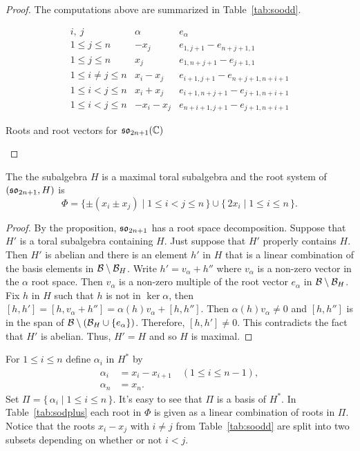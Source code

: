 \begin{proof}
  The computations above are summarized in Table~\ref{tab:soodd}.
  \begin{table}[h!tb]
    \small {}
    \renewcommand{\arraystretch}{1.3}
    \begin{equation*}
      \begin{array}{l|cc}
        i,\ j &\alpha &e_\alpha\\\hline
        1\leq j\leq n&-x_j & e_{1,j+1} -e_{n+j+1, 1}\\
        1\leq j\leq n&x_j & e_{1,n+j+1} -e_{j+1, 1}\\
        1\leq i\ne j\leq n&x_i-x_j &  e_{i+1,j+1} -e_{n+j+1, n+i+1} \\
        1\leq i< j\leq n&x_i+x_j & e_{i+1,n+j+1} -e_{j+1, n+i+1} \\ 
        1\leq i< j\leq n&-x_i-x_j & e_{n+i+1,j+1} -e_{j+1, n+i+1}
      \end{array}  
    \end{equation*}
    \caption{Roots and root vectors for $\mathfrak {so}_{2n+1}({\mathbb C})$}\label{tab:soodd}
  \end{table}
\end{proof}

\begin{corollary}
  The the subalgebra $H$ is a maximal toral subalgebra and the root system
  of $(\mathfrak {so}_{2n+1}, H)$ is
  \[
  \Phi=\{\pm(x_i\pm x_j) \mid 1\leq i<j\leq n\,\} \cup \{\, 2x_i\mid 1\leq
  i\leq n\,\}.
  \]
\end{corollary}

\begin{proof}
  By the proposition, $\mathfrak {so}_{2n+1}$ has a root space decomposition. Suppose
  that $H'$ is a toral subalgebra containing $H$. Just suppose that $H'$
  properly contains $H$. Then $H'$ is abelian and there is an element $h'$
  in $H$ that is a linear combination of the basis elements in ${\mathcal B}\setminus
  {\mathcal B}_H$. Write $h'=v_\alpha+h''$ where $v_\alpha$ is a non-zero vector in
  the $\alpha$ root space. Then $v_\alpha$ is a non-zero multiple of the
  root vector $e_\alpha$ in ${\mathcal B}\setminus {\mathcal B}_H$. Fix $h$ in $H$ such that
  $h$ is not in $\ker \alpha$, then $[h,h']= [h, v_\alpha+h'']=
  \alpha(h)v_\alpha + [h,h'']$. Then $\alpha(h)v_\alpha\ne 0$ and $[h, h'']$
  is in the span of ${\mathcal B}\setminus({\mathcal B}_H\cup \{e_\alpha\})$. Therefore,
  $[h,h'] \ne0$. This contradicts the fact that $H'$ is abelian. Thus,
  $H'=H$ and so $H$ is maximal.
\end{proof}

For $1\leq i\leq n$ define $\alpha_i$ in $H^*$ by
\begin{align*}
  \alpha_i&=x_i-x_{i+1} \quad (1\leq i\leq n-1),\\
  \alpha_n&= x_n.
\end{align*}
Set $\Pi=\{\, \alpha_i\mid 1\leq i\leq n\,\}$. It's easy to see that $\Pi$
is a basis of $H^*$. In Table~\ref{tab:sodplus} each root in $\Phi$ is given
as a linear combination of roots in $\Pi$. Notice that the roots $x_i-x_j$
with $i\ne j$ from Table~\ref{tab:soodd} are split into two subsets depending
on whether or not $i<j$.

